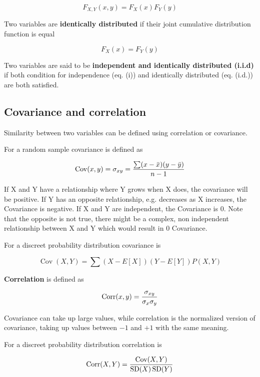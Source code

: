 \begin{equation}F_{X,Y}(x,y) = F_X(x)F_Y(y)\tag{i}\end{equation}

Two variables are \textbf{identically distributed} if their joint cumulative distribution function is equal

\begin{equation}F_X(x) = F_Y(y)\tag{i.d}\end{equation}

Two variables are said to be \textbf{independent and identically distributed (i.i.d)} if both condition for independence (eq. (i)) and identically distributed (eq. (i.d.)) are both satisfied.

\subsection{Covariance and correlation}

Similarity between two variables can be defined using correlation or covariance.

For a random sample covariance is defined as

\[\operatorname{Cov}(x,y) = \sigma_{xy} = {\sum(x - \bar x)(y - \bar y) \over n-1}\]

If X and Y have a relationship where Y grows when X does, the covariance will be positive. If Y has an opposite relationship, e.g. decreases as X increases, the Covariance is negative. If X and Y are independent, the Covariance is \(0\). Note that the opposite is not true, there might be a complex, non independent relationship between X and Y which would result in 0 Covariance.

For a discreet probability distribution covariance is

\[\operatorname{Cov}(X, Y) = \sum(X - E[X])(Y - E[Y])P(X,Y)\]

\textbf{Correlation} is defined as

\[\operatorname{Corr}(x,y) = {\sigma_{xy} \over \sigma_x \sigma_y}\]

Covariance can take up large values, while correlation is the normalized version of covariance, taking up values between \(-1\) and \(+1\) with the same meaning.

For a discreet probability distribution correlation is

\[\operatorname{Corr}(X, Y) = {\operatorname{Cov}(X, Y) \over \operatorname{SD}(X)\operatorname{SD}(Y)}\]

